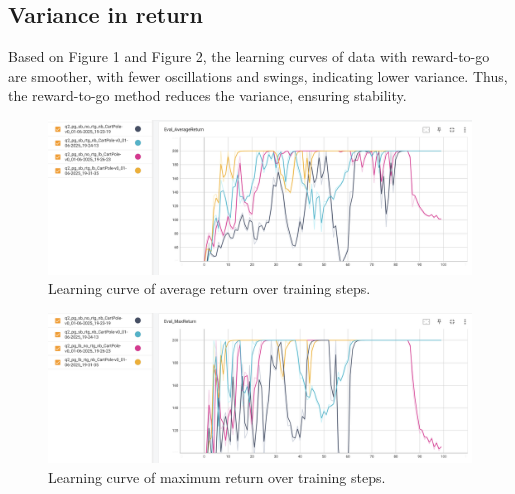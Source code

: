 \documentclass{article} %
\begin{document}
\subsection{Variance in return}
Based on Figure 1 and Figure 2, the learning curves of data with reward-to-go are smoother, with fewer oscillations and swings, indicating lower variance. Thus, the reward-to-go method reduces the variance, ensuring stability.
\begin{figure}[H]
    \centering
    \includegraphics[width=1\linewidth]{eval_AverageReturn.png}
    \caption{Learning curve of average return over training steps.}
    \label{fig:average}
\end{figure}
\begin{figure}[H]
    \centering
    \includegraphics[width=1\linewidth]{Eval_MaxReturn.png}
    \caption{Learning curve of maximum return over training steps.}
    \label{fig:max}
\end{figure}
\end{document}
